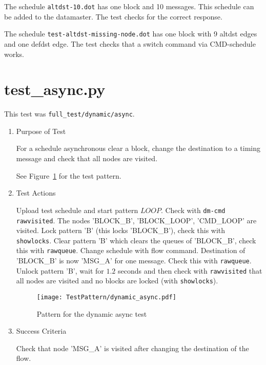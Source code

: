 \documentclass[12pt,a4paper]{report}
\begin{document}
The schedule \texttt{altdst-10.dot} has one block and 10 messages.
This schedule can be added to the datamaster. The test checks for
the correct response.

The schedule \texttt{test-altdst-missing-node.dot} has one block with 9
altdst edges and one defdst edge. The test checks that a switch command
via CMD-schedule works.

\section{test\_async.py}
This test was \texttt{full\_test/dynamic/async}.
\begin{enumerate}
  \item Purpose of Test

  For a schedule asynchronous clear a block, change the destination to
  a timing message and check that all nodes are visited.

  See Figure~\ref{fig:Pattern_for_the_dynamic_async_test} for the test pattern.
  \item Test Actions

  Upload test schedule and start pattern $LOOP$. Check with \texttt{dm-cmd rawvisited}. The
  nodes 'BLOCK\_B', 'BLOCK\_LOOP', 'CMD\_LOOP' are visited. Lock pattern 'B' (this locks 'BLOCK\_B'), check this with
  \texttt{showlocks}. Clear pattern 'B' which clears the queues of 'BLOCK\_B', check this with \texttt{rawqueue}.
  Change schedule with flow command. Destination of 'BLOCK\_B' is now 'MSG\_A' for one message. Check this
  with \texttt{rawqueue}. Unlock pattern 'B', wait for $1.2$ seconds and then check with \texttt{rawvisited} that all
  nodes are visited and no blocks are locked (with \texttt{showlocks}).
    \begin{figure}
        \centering
        \texttt{[image: TestPattern/dynamic\_async.pdf]}
        \caption{Pattern for the dynamic async test}
        \label{fig:Pattern_for_the_dynamic_async_test}
    \end{figure}
  \item Success Criteria

  Check that node 'MSG\_A' is visited after changing the destination of the flow.
\end{enumerate}
\end{document}

